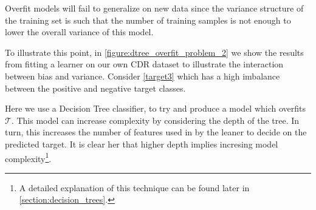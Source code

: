 Overfit models will fail to generalize on new data since the variance structure of the training set is such that the number of training samples is not enough to lower the overall variance of this model. 




%
%



To illustrate this point, in \cref{figure:dtree_overfit_problem_2} we show the results from fitting a learner on our own CDR dataset to illustrate the interaction between bias and variance.
Consider \cref{target3} which has a high imbalance between the positive and negative target classes.

Here we use a Decision Tree classifier, to try and produce a model which overfits $\mathcal{T}$.
This model can increase complexity by considering the depth of the tree.
In turn, this increases the number of features used in by the leaner to decide on the predicted target.
It is clear her that higher depth implies incresing model complexity\footnote{A detailed explanation of this technique can be found later in \cref{section:decision_trees}.}.

